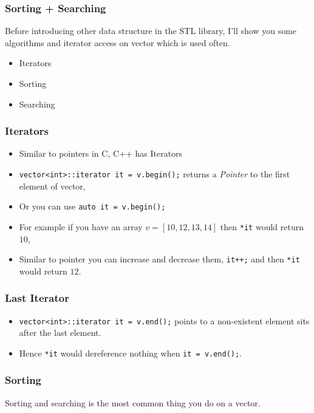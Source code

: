 \begin{frame}
    \frametitle{Sorting + Searching}

    Before introducing other data structure in the STL library,
    I'll show you some algorithms and iterator access on vector which is used often.


    \begin{itemize}
        \item Iterators
        \item Sorting
        \item Searching
    \end{itemize}

\end{frame}

\begin{frame}
    \frametitle{Iterators}

    
    \begin{itemize}
        \item Similar to pointers in C, C++ has Iterators \pause[]
        \item \texttt{vector<int>::iterator it = v.begin();} returns a \textit{Pointer} to the first element of vector, \pause[]
        \item Or you can use \texttt{auto it = v.begin();}\pause[]
        \item For example if you have an array $v = [10, 12, 13,14]$ then \texttt{*it} would return $10$,\pause[]
        \item Similar to pointer you can increase and decrease them, \texttt{it++;} and then \texttt{*it} would return $12$.
    \end{itemize}

\end{frame}

\begin{frame}
    \frametitle{Last Iterator}

    
    \begin{itemize}
        \item \texttt{vector<int>::iterator it = v.end();} points to a non-existent element sits after the last element.\pause[]
        \item Hence \texttt{*it} would dereference nothing when \texttt{it = v.end();}.
    \end{itemize}

\end{frame}

\begin{frame}
    \frametitle{Sorting}

    Sorting and searching is the most common thing you do on a vector.

    

\end{frame}

